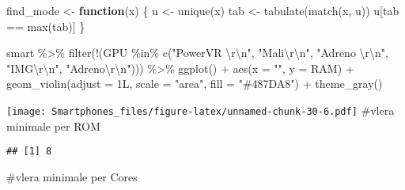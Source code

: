 \documentclass[
]{article}
\newenvironment{Shaded}{\begin{snugshade}}{\end{snugshade}}
\newcommand{\AttributeTok}[1]{\textcolor[rgb]{0.77,0.63,0.00}{#1}}
\newcommand{\ControlFlowTok}[1]{\textcolor[rgb]{0.13,0.29,0.53}{\textbf{#1}}}
\newcommand{\FunctionTok}[1]{\textcolor[rgb]{0.00,0.00,0.00}{#1}}
\newcommand{\NormalTok}[1]{#1}
\newcommand{\OtherTok}[1]{\textcolor[rgb]{0.56,0.35,0.01}{#1}}
\newcommand{\SpecialCharTok}[1]{\textcolor[rgb]{0.00,0.00,0.00}{#1}}
\newcommand{\StringTok}[1]{\textcolor[rgb]{0.31,0.60,0.02}{#1}}
\begin{document}
\begin{Shaded}
\begin{Highlighting}[]
\NormalTok{find\_mode }\OtherTok{\textless{}{-}} \ControlFlowTok{function}\NormalTok{(x) \{}
\NormalTok{ u }\OtherTok{\textless{}{-}} \FunctionTok{unique}\NormalTok{(x)}
\NormalTok{  tab }\OtherTok{\textless{}{-}} \FunctionTok{tabulate}\NormalTok{(}\FunctionTok{match}\NormalTok{(x, u))}
\NormalTok{  u[tab }\SpecialCharTok{==} \FunctionTok{max}\NormalTok{(tab)]}
\NormalTok{\}}
  
\NormalTok{  smart }\SpecialCharTok{\%\textgreater{}\%}
 \FunctionTok{filter}\NormalTok{(}\SpecialCharTok{!}\NormalTok{(GPU }\SpecialCharTok{\%in\%} \FunctionTok{c}\NormalTok{(}\StringTok{"PowerVR }\SpecialCharTok{\textbackslash{}r\textbackslash{}n}\StringTok{"}\NormalTok{, }\StringTok{"Mali}\SpecialCharTok{\textbackslash{}r\textbackslash{}n}\StringTok{"}\NormalTok{, }\StringTok{"Adreno }\SpecialCharTok{\textbackslash{}r\textbackslash{}n}\StringTok{"}\NormalTok{, }\StringTok{"IMG}\SpecialCharTok{\textbackslash{}r\textbackslash{}n}\StringTok{"}\NormalTok{, }\StringTok{"Adreno}\SpecialCharTok{\textbackslash{}r\textbackslash{}n}\StringTok{"}\NormalTok{))) }\SpecialCharTok{\%\textgreater{}\%}
 \FunctionTok{ggplot}\NormalTok{() }\SpecialCharTok{+}
  \FunctionTok{aes}\NormalTok{(}\AttributeTok{x =} \StringTok{""}\NormalTok{, }\AttributeTok{y =}\NormalTok{ RAM) }\SpecialCharTok{+}
  \FunctionTok{geom\_violin}\NormalTok{(}\AttributeTok{adjust =}\NormalTok{ 1L, }\AttributeTok{scale =} \StringTok{"area"}\NormalTok{, }\AttributeTok{fill =} \StringTok{"\#487DA8"}\NormalTok{) }\SpecialCharTok{+}
  \FunctionTok{theme\_gray}\NormalTok{()}
\end{Highlighting}
\end{Shaded}

\texttt{[image: Smartphones\_files/figure-latex/unnamed-chunk-30-6.pdf]}
\#vlera minimale per ROM

\begin{Shaded}
\end{Shaded}

\begin{verbatim}
## [1] 8
\end{verbatim}

\#vlera minimale per Cores

\begin{Shaded}
\end{Shaded}
\end{document}
